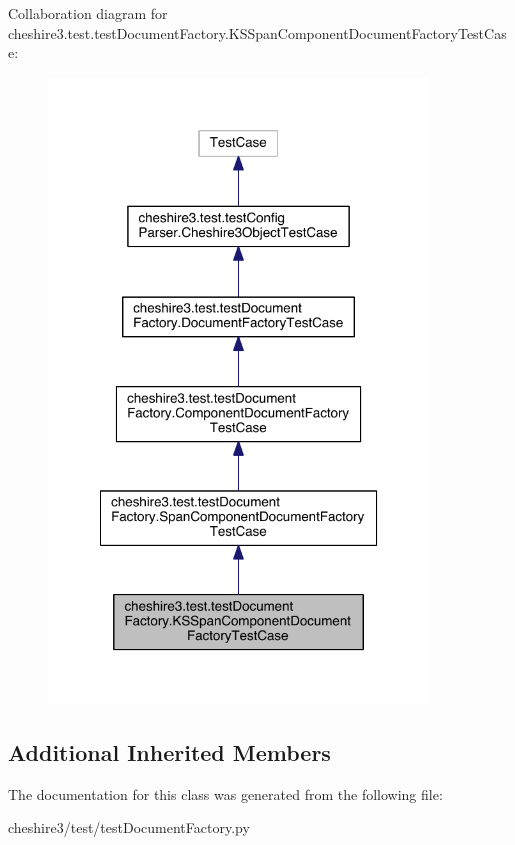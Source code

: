 Collaboration diagram for cheshire3.\-test.\-test\-Document\-Factory.\-K\-S\-Span\-Component\-Document\-Factory\-Test\-Case\-:
\nopagebreak
\begin{figure}[H]
\begin{center}
\leavevmode
\includegraphics[width=286pt]{classcheshire3_1_1test_1_1test_document_factory_1_1_k_s_span_component_document_factory_test_case__coll__graph}
\end{center}
\end{figure}
\subsection*{Additional Inherited Members}


The documentation for this class was generated from the following file\-:\begin{DoxyCompactItemize}
\item 
cheshire3/test/test\-Document\-Factory.\-py\end{DoxyCompactItemize}
